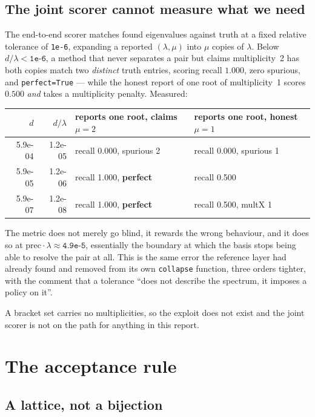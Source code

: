 \documentclass[11pt,a4paper]{article}
\newcommand{\pr}{\ensuremath{\mathrm{prec}}}
\newcommand{\lam}{\ensuremath{\lambda}}
\begin{document}
\subsection{The joint scorer cannot measure what we need}

The end-to-end scorer matches found eigenvalues against truth at a fixed relative tolerance of
\texttt{1e-6}, expanding a reported $(\lam, \mu)$ into $\mu$ copies of $\lam$. Below
$d/\lam < \texttt{1e-6}$, a method that never separates a pair but claims multiplicity~2 has both
copies match two \emph{distinct} truth entries, scoring recall $1.000$, zero spurious, and
\texttt{perfect=True} --- while the honest report of one root of multiplicity~1 scores $0.500$
\emph{and} takes a multiplicity penalty. Measured:

\begin{center}
\begin{tabular}{rrll}
\toprule
$d$ & $d/\lam$ & reports one root, claims $\mu=2$ & reports one root, honest $\mu=1$ \\
\midrule
5.9e-04 & 1.2e-05 & recall 0.000, spurious 2 & recall 0.000, spurious 1 \\
5.9e-05 & 1.2e-06 & recall 1.000, \textbf{perfect} & recall 0.500 \\
5.9e-07 & 1.2e-08 & recall 1.000, \textbf{perfect} & recall 0.500, multX 1 \\
\bottomrule
\end{tabular}
\end{center}

\noindent
The metric does not merely go blind, it rewards the wrong behaviour, and it does so at
$\pr\!\cdot\!\lam \approx \texttt{4.9e-5}$, essentially the boundary at which the basis stops
being able to resolve the pair at all. This is the same error the reference layer had already
found and removed from its own \texttt{collapse} function, three orders tighter, with the
comment that a tolerance ``does not describe the spectrum, it imposes a policy on it''.

A bracket set carries no multiplicities, so the exploit does not exist and the joint scorer is
not on the path for anything in this report.

\section{The acceptance rule}

\subsection{A lattice, not a bijection}
\end{document}
